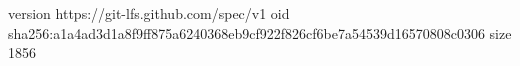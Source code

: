 version https://git-lfs.github.com/spec/v1
oid sha256:a1a4ad3d1a8f9ff875a6240368eb9cf922f826cf6be7a54539d16570808c0306
size 1856
